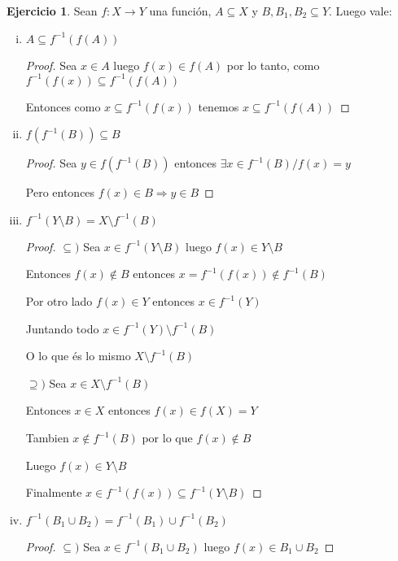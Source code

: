 \documentclass[12pt]{article}
\newcommand{\Ra}{\Rightarrow}
\newcommand{\ra}{\rightarrow}
\theoremstyle{definition}
\newtheorem{ej}{Ejercicio}
\begin{document}
\begin{ej}
Sean $f: X \ra Y$ una función, $A \subseteq X$ y $B,B_{1},B_{2} \subseteq Y.$ Luego vale:

\begin{enumerate}[i.]
  \item $A \subseteq f^{-1} (f(A))$
    \begin{proof}
      
      Sea $x \in A$ luego $f(x) \in f(A)$ por lo tanto, como $ f^{-1}(f(x)) \subseteq f^{-1}(f(A))$  
    
      Entonces como $x \subseteq f^{-1}(f(x)) $ tenemos $x \subseteq f^{-1}(f(A)) $ 
  \end{proof}
  \item $f(f^{-1}(B)) \subseteq B$
    \begin{proof}
      Sea $y \in f(f^{-1}(B))$ entonces $\exists x \in f^{-1}(B) / f(x) = y$

      Pero entonces $f(x) \in B \Ra y \in B$
    \end{proof}
     
  \item $f^{-1}(Y \setminus B) = X \setminus f^{-1}(B)$
    \begin{proof}
      $\subseteq )$ Sea $x \in f^{-1}(Y \setminus B)$ luego $f(x) \in Y \setminus B$

      Entonces $f(x) \notin B$ entonces $x = f^{-1}(f(x)) \notin f^{-1}(B) $

      Por otro lado $f(x) \in Y$ entonces $x \in f^{-1}(Y)$

      Juntando todo $x \in f^{-1}(Y) \setminus f^{-1}(B)$

      O lo que és lo mismo $X \setminus f^{-1}(B)$

      $\supseteq )$ Sea $x \in X \setminus f^{-1}(B)$ 

      Entonces $x \in X$ entonces $f(x) \in f(X)=Y $

      Tambien $x \notin f^{-1}(B)$ por lo que $f(x) \notin B$

      Luego $f(x) \in Y \setminus B$

      Finalmente $x \in f^{-1}(f(x)) \subseteq f^{-1}(Y \setminus B)$
     \end{proof}

   \item $f^{-1}(B_{1} \cup B_{2}) = f^{-1}(B_{1}) \cup f^{-1}(B_{2})$
      \begin{proof}
        $\subseteq )$ Sea $ x \in f^{-1}(B_{1} \cup B_{2})$ luego $f(x) \in B_{1} \cup B_{2}$


\end{proof}
\end{enumerate}
\end{ej}
\end{document}
